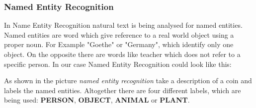 \documentclass[12pt, oneside]{article}
\begin{document}
\subsubsection{Named Entity Recognition} \label{ner}
In Name Entity Recognition natural text is being analysed for  named entities. Named entities are word which give reference to a real world object using a proper noun. For Example "Goethe" or "Germany", which identify only one object. On the opposite there are words like teacher which does not refer to a specific person.
In our case Named Entity Recognition could look like this:
\begin{center}
\end{center}
As shown in the picture \textit{named entity recognition} take a description of a coin and labels the named entities. Altogether there are four different labels, which are being used: \textbf{PERSON}, \textbf{OBJECT}, \textbf{ANIMAL} or \textbf{PLANT}. 
\newpage
\end{document}
